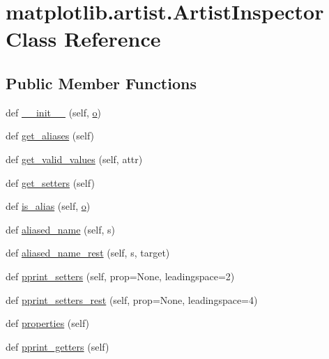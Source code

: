 \hypertarget{classmatplotlib_1_1artist_1_1ArtistInspector}{}\section{matplotlib.\+artist.\+Artist\+Inspector Class Reference}
\label{classmatplotlib_1_1artist_1_1ArtistInspector}
\subsection*{Public Member Functions}
\begin{DoxyCompactItemize}
\item 
def \hyperlink{classmatplotlib_1_1artist_1_1ArtistInspector_a77b97935c89bb36585a56a2ba3e5b5cc}{\+\_\+\+\_\+init\+\_\+\+\_\+} (self, \hyperlink{classmatplotlib_1_1artist_1_1ArtistInspector_afbaadd08e0b528dab9909914d9ea8b90}{o})
\item 
def \hyperlink{classmatplotlib_1_1artist_1_1ArtistInspector_a04d9c28b08088f8839e14a4b6d3e57aa}{get\+\_\+aliases} (self)
\item 
def \hyperlink{classmatplotlib_1_1artist_1_1ArtistInspector_a1c27c04716e40612bbcb4e6287c7d118}{get\+\_\+valid\+\_\+values} (self, attr)
\item 
def \hyperlink{classmatplotlib_1_1artist_1_1ArtistInspector_a7cd62163bffa3947835a355bb2d7be66}{get\+\_\+setters} (self)
\item 
def \hyperlink{classmatplotlib_1_1artist_1_1ArtistInspector_a7ca4fefd048b631d03f4f346f2b4becd}{is\+\_\+alias} (self, \hyperlink{classmatplotlib_1_1artist_1_1ArtistInspector_afbaadd08e0b528dab9909914d9ea8b90}{o})
\item 
def \hyperlink{classmatplotlib_1_1artist_1_1ArtistInspector_abe46d203d92aa084cebb9322b58e8538}{aliased\+\_\+name} (self, s)
\item 
def \hyperlink{classmatplotlib_1_1artist_1_1ArtistInspector_ab6a0ede430ff36c1a7dc291b20f0e5df}{aliased\+\_\+name\+\_\+rest} (self, s, target)
\item 
def \hyperlink{classmatplotlib_1_1artist_1_1ArtistInspector_a33ec11b28b0d30bea1ea8f7c35948284}{pprint\+\_\+setters} (self, prop=None, leadingspace=2)
\item 
def \hyperlink{classmatplotlib_1_1artist_1_1ArtistInspector_a7d50c764584389275f84c1e92ab27e12}{pprint\+\_\+setters\+\_\+rest} (self, prop=None, leadingspace=4)
\item 
def \hyperlink{classmatplotlib_1_1artist_1_1ArtistInspector_a29e16c69d2062d22a3e96d21217d6666}{properties} (self)
\item 
def \hyperlink{classmatplotlib_1_1artist_1_1ArtistInspector_a4a3cb9ee757858f9a5e26c595b05af2a}{pprint\+\_\+getters} (self)
\end{DoxyCompactItemize}
